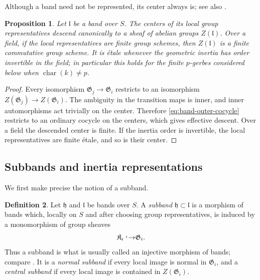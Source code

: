 \documentclass[11pt,reqno]{amsart}
\numberwithin{equation}{section}
\theoremstyle{plain}
\newtheorem{prop}{Proposition}[section]
\theoremstyle{definition}
\newtheorem{defi}[prop]{Definition}
\def\fG{{\mathfrak G}}
\def\fK{{\mathfrak K}}
\def\ra{{\rightarrow}}
\begin{document}
Although a band need not be represented, its center always is; see also
\cite[Part~II, Section~5.1]{Duskin}.

\begin{prop}\label{prop:center-of-band}
Let $\mathfrak l$ be a band over $S$. The centers of its local group
representatives descend canonically to a sheaf of abelian groups
$Z(\mathfrak l)$.  Over a field, if the local representatives are
finite group schemes, then $Z(\mathfrak l)$ is a finite commutative
group scheme.  It is \'etale whenever the geometric inertia has order
invertible in the field; in particular this holds for the finite
$p$-gerbes considered below when $\operatorname{char}(k)\ne p$.
\end{prop}

\begin{proof}
Every isomorphism $\fG_j\to\fG_i$ restricts to an isomorphism
$Z(\fG_j)\to Z(\fG_i)$.  The ambiguity in the transition maps is inner,
and inner automorphisms act trivially on the center.  Therefore
\eqref{eq:band-outer-cocycle} restricts to an ordinary cocycle on the
centers, which gives effective descent.  Over a field the descended
center is finite.  If the inertia order is invertible, the local
representatives are finite \'etale, and so is their center.
\end{proof}

\subsection{Subbands and inertia representations}
We first make precise the notion of a subband.

\begin{defi}\label{def:subband}
Let $\mathfrak h$ and $\mathfrak l$ be bands over $S$.  A
\emph{subband} $\mathfrak h\subset\mathfrak l$ is a morphism of bands
which, locally on $S$ and after choosing group representatives, is
induced by a monomorphism of group sheaves
\[
\fK_i\lhook\joinrel\ra\fG_i.
\]
Thus a subband is what is usually called an injective morphism of bands;
compare \cite[III,~3.3.3, p.~205]{Saavedra}.  It is a \emph{normal
subband} if every local image is normal in $\fG_i$, and a \emph{central
subband} if every local image is contained in $Z(\fG_i)$.
\end{defi}
\end{document}
